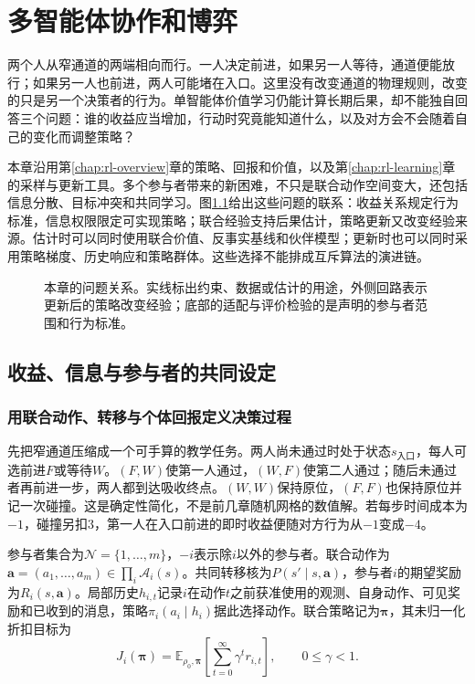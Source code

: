 \chapter{多智能体协作和博弈}
\label{chap:rl-multi-agent}

两个人从窄通道的两端相向而行。一人决定前进，如果另一人等待，通道便能放行；如果另一人也前进，两人可能堵在入口。这里没有改变通道的物理规则，改变的只是另一个决策者的行为。单智能体价值学习仍能计算长期后果，却不能独自回答三个问题：谁的收益应当增加，行动时究竟能知道什么，以及对方会不会随着自己的变化而调整策略？

本章沿用第\ref{chap:rl-overview}章的策略、回报和价值，以及第\ref{chap:rl-learning}章的采样与更新工具。多个参与者带来的新困难，不只是联合动作空间变大，还包括信息分散、目标冲突和共同学习。图\ref{fig:rl-multi-agent-map}给出这些问题的联系：收益关系规定行为标准，信息权限限定可实现策略；联合经验支持后果估计，策略更新又改变经验来源。估计时可以同时使用联合价值、反事实基线和伙伴模型；更新时也可以同时采用策略梯度、历史响应和策略群体。这些选择不能排成互斥算法的演进链。

\begin{figure}[htbp]
  \centering
  
  \caption{本章的问题关系。实线标出约束、数据或估计的用途，外侧回路表示更新后的策略改变经验；底部的适配与评价检验的是声明的参与者范围和行为标准。}
  \label{fig:rl-multi-agent-map}
\end{figure}

\section{收益、信息与参与者的共同设定}
\label{sec:rl-multi-agent-setting}

\subsection{用联合动作、转移与个体回报定义决策过程}
\label{sec:rl-multi-agent-process}

先把窄通道压缩成一个可手算的教学任务。两人尚未通过时处于状态$s_{\text{入口}}$，每人可选前进$F$或等待$W$。$(F,W)$使第一人通过，$(W,F)$使第二人通过；随后未通过者再前进一步，两人都到达吸收终点。$(W,W)$保持原位，$(F,F)$也保持原位并记一次碰撞。这是确定性简化，不是前几章随机网格的数值解。若每步时间成本为$-1$，碰撞另扣$3$，第一人在入口前进的即时收益便随对方行为从$-1$变成$-4$。

\begin{definition}[多参与者序贯决策]
\label{def:rl-multi-agent-game}
参与者集合为$\mathcal N=\{1,\ldots,m\}$，$-i$表示除$i$以外的参与者。联合动作为$\bm a=(a_1,\ldots,a_m)\in\prod_i\mathcal A_i(s)$。共同转移核为$P(s'\mid s,\bm a)$，参与者$i$的期望奖励为$R_i(s,\bm a)$。局部历史$h_{i,t}$记录$i$在动作$t$之前获准使用的观测、自身动作、可见奖励和已收到的消息，策略$\pi_i(a_i\mid h_i)$据此选择动作。联合策略记为$\bm\pi$，其未归一化折扣目标为
\[
 J_i(\bm\pi)=\mathbb E_{\rho_0,\bm\pi}
 \left[\sum_{t=0}^{\infty}\gamma^t r_{i,t}\right],
 \qquad 0\leq\gamma<1.
\]
\end{definition}

